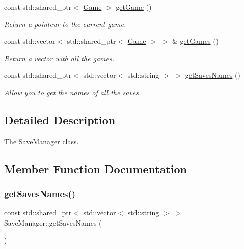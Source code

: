 \begin{DoxyCompactItemize}
\mbox{\label{classSaveManager_a7b950ce71223640fe56e8d404fe3cd2f}} 
const std\+::shared\+\_\+ptr$<$ \hyperlink{classGame}{Game} $>$ \hyperlink{classSaveManager_a7b950ce71223640fe56e8d404fe3cd2f}{get\+Game} ()
\begin{DoxyCompactList}\small\item\em Return a pointeur to the current game. \end{DoxyCompactList}\item 
\mbox{\label{classSaveManager_ab71d9799fb6766b0946c06fddd9c50fa}} 
const std\+::vector$<$ std\+::shared\+\_\+ptr$<$ \hyperlink{classGame}{Game} $>$ $>$ \& \hyperlink{classSaveManager_ab71d9799fb6766b0946c06fddd9c50fa}{get\+Games} ()
\begin{DoxyCompactList}\small\item\em Return a vector with all the games. \end{DoxyCompactList}\item 
const std\+::shared\+\_\+ptr$<$ std\+::vector$<$ std\+::string $>$ $>$ \hyperlink{classSaveManager_a335611df31b6a1eccb5c7df73bc2e778}{get\+Saves\+Names} ()
\begin{DoxyCompactList}\small\item\em Allow you to get the names of all the saves. \end{DoxyCompactList}\end{DoxyCompactItemize}


\subsection{Detailed Description}
The \hyperlink{classSaveManager}{Save\+Manager} class. 

\subsection{Member Function Documentation}
\mbox{\label{classSaveManager_a335611df31b6a1eccb5c7df73bc2e778}} 
\subsubsection{\texorpdfstring{get\+Saves\+Names()}{getSavesNames()}}
{\footnotesize\ttfamily const std\+::shared\+\_\+ptr$<$ std\+::vector$<$ std\+::string $>$ $>$ Save\+Manager\+::get\+Saves\+Names (\begin{DoxyParamCaption}{ }\end{DoxyParamCaption})}



